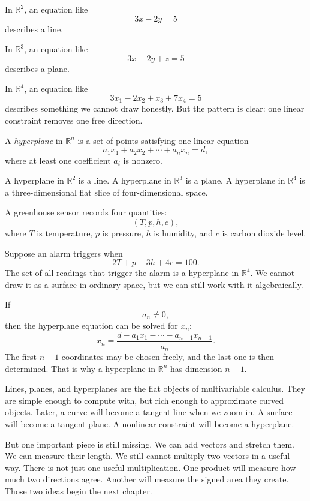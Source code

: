 In \(\mathbb R^2\), an equation like
\[
    3x-2y=5
\]
describes a line.

In \(\mathbb R^3\), an equation like
\[
    3x-2y+z=5
\]
describes a plane.

In \(\mathbb R^4\), an equation like
\[
    3x_1-2x_2+x_3+7x_4=5
\]
describes something we cannot draw honestly.  But the pattern is clear: one linear
constraint removes one free direction.

\begin{definition}[Hyperplane]
A \emph{hyperplane} in \(\mathbb R^n\) is a set of points satisfying one linear equation
\[
    a_1x_1+a_2x_2+\cdots+a_nx_n=d,
\]
where at least one coefficient \(a_i\) is nonzero.
\end{definition}

A hyperplane in \(\mathbb R^2\) is a line.  A hyperplane in \(\mathbb R^3\) is a plane.
A hyperplane in \(\mathbb R^4\) is a three-dimensional flat slice of four-dimensional
space.

\begin{example}
A greenhouse sensor records four quantities:
\[
    (T,p,h,c),
\]
where \(T\) is temperature, \(p\) is pressure, \(h\) is humidity, and \(c\) is carbon dioxide
level.

Suppose an alarm triggers when
\[
    2T+p-3h+4c=100.
\]
The set of all readings that trigger the alarm is a hyperplane in \(\mathbb R^4\).
We cannot draw it as a surface in ordinary space, but we can still work with it
algebraically.
\end{example}

If
\[
    a_n\neq0,
\]
then the hyperplane equation can be solved for \(x_n\):
\[
    x_n
    =
    \frac{d-a_1x_1-\cdots-a_{n-1}x_{n-1}}{a_n}.
\]
The first \(n-1\) coordinates may be chosen freely, and the last one is then determined.
That is why a hyperplane in \(\mathbb R^n\) has dimension \(n-1\).

Lines, planes, and hyperplanes are the flat objects of multivariable calculus.  They are
simple enough to compute with, but rich enough to approximate curved objects.  Later,
a curve will become a tangent line when we zoom in.  A surface will become a tangent
plane.  A nonlinear constraint will become a hyperplane.

But one important piece is still missing.  We can add vectors and stretch them.  We can
measure their length.  We still cannot multiply two vectors in a useful way.  There is
not just one useful multiplication.  One product will measure how much two directions
agree.  Another will measure the signed area they create.  Those two ideas begin the
next chapter.

